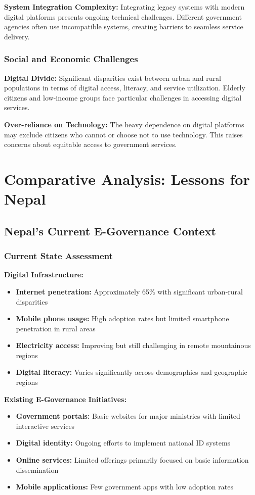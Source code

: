 \documentclass[12pt,a4paper]{article}
\begin{document}
\textbf{System Integration Complexity:}
Integrating legacy systems with modern digital platforms presents ongoing technical challenges. Different government agencies often use incompatible systems, creating barriers to seamless service delivery.

\subsubsection{Social and Economic Challenges}

\textbf{Digital Divide:}
Significant disparities exist between urban and rural populations in terms of digital access, literacy, and service utilization. Elderly citizens and low-income groups face particular challenges in accessing digital services.

\textbf{Over-reliance on Technology:}
The heavy dependence on digital platforms may exclude citizens who cannot or choose not to use technology. This raises concerns about equitable access to government services.

\section{Comparative Analysis: Lessons for Nepal}

\subsection{Nepal's Current E-Governance Context}

\subsubsection{Current State Assessment}

\textbf{Digital Infrastructure:}
\begin{itemize}
    \item \textbf{Internet penetration:} Approximately 65\% with significant urban-rural disparities
    \item \textbf{Mobile phone usage:} High adoption rates but limited smartphone penetration in rural areas
    \item \textbf{Electricity access:} Improving but still challenging in remote mountainous regions
    \item \textbf{Digital literacy:} Varies significantly across demographics and geographic regions
\end{itemize}

\textbf{Existing E-Governance Initiatives:}
\begin{itemize}
    \item \textbf{Government portals:} Basic websites for major ministries with limited interactive services
    \item \textbf{Digital identity:} Ongoing efforts to implement national ID systems
    \item \textbf{Online services:} Limited offerings primarily focused on basic information dissemination
    \item \textbf{Mobile applications:} Few government apps with low adoption rates
\end{itemize}
\end{document}

